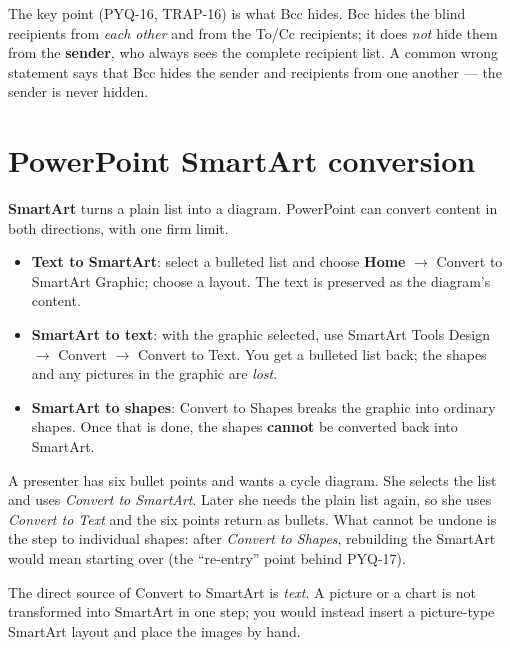 The key point (PYQ-16, TRAP-16) is what Bcc hides. Bcc hides the blind
recipients from \emph{each other} and from the To/Cc recipients; it does
\emph{not} hide them from the \textbf{sender}, who always sees the complete
recipient list. A common wrong statement says that Bcc hides the sender and
recipients from one another --- the sender is never hidden.

\section{PowerPoint SmartArt conversion}
\textbf{SmartArt} turns a plain list into a diagram. PowerPoint can convert
content in both directions, with one firm limit.

\begin{itemize}
  \item \textbf{Text to SmartArt}: select a bulleted list and choose
    \textbf{Home} $\rightarrow$ Convert to SmartArt Graphic; choose a layout.
    The text is preserved as the diagram's content.
  \item \textbf{SmartArt to text}: with the graphic selected, use SmartArt
    Tools Design $\rightarrow$ Convert $\rightarrow$ Convert to Text. You get
    a bulleted list back; the shapes and any pictures in the graphic are
    \emph{lost}.
  \item \textbf{SmartArt to shapes}: Convert to Shapes breaks the graphic
    into ordinary shapes. Once that is done, the shapes \textbf{cannot} be
    converted back into SmartArt.
\end{itemize}

\begin{example}
A presenter has six bullet points and wants a cycle diagram. She selects the
list and uses \emph{Convert to SmartArt}. Later she needs the plain list
again, so she uses \emph{Convert to Text} and the six points return as
bullets. What cannot be undone is the step to individual shapes: after
\emph{Convert to Shapes}, rebuilding the SmartArt would mean starting over
(the ``re-entry'' point behind PYQ-17).
\end{example}

The direct source of Convert to SmartArt is \emph{text}. A picture or a chart
is not transformed into SmartArt in one step; you would instead insert a
picture-type SmartArt layout and place the images by hand.

